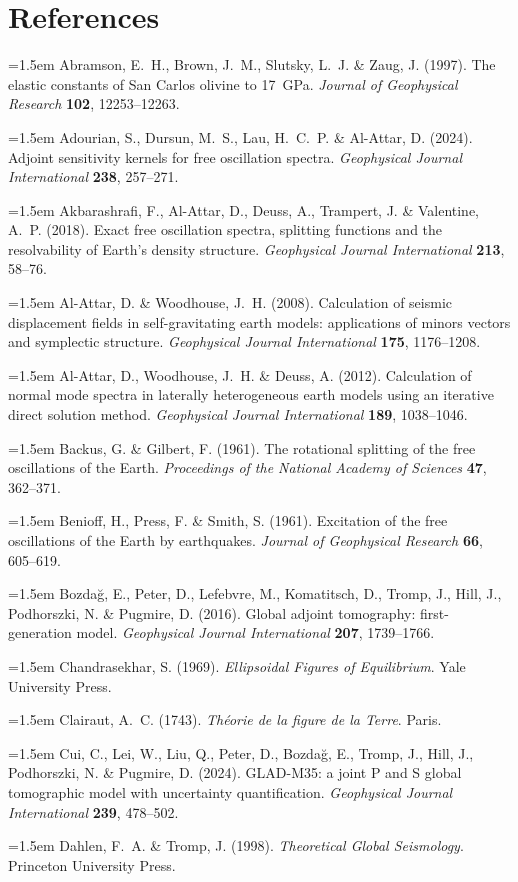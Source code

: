 \documentclass[a4paper,12pt]{paper}
\begin{document}
\section*{References}
\begingroup
\setlength{\parindent}{0pt}\setlength{\parskip}{2pt plus 1pt}
\newcommand{\refitem}[1]{\par\hangindent=1.5em #1}
\refitem{Abramson, E.~H., Brown, J.~M., Slutsky, L.~J. \& Zaug, J. (1997). The elastic constants of San Carlos olivine to 17~GPa. \emph{Journal of Geophysical Research} \textbf{102}, 12253--12263.}
\refitem{Adourian, S., Dursun, M.~S., Lau, H.~C.~P. \& Al-Attar, D. (2024). Adjoint sensitivity kernels for free oscillation spectra. \emph{Geophysical Journal International} \textbf{238}, 257--271.}
\refitem{Akbarashrafi, F., Al-Attar, D., Deuss, A., Trampert, J. \& Valentine, A.~P. (2018). Exact free oscillation spectra, splitting functions and the resolvability of Earth's density structure. \emph{Geophysical Journal International} \textbf{213}, 58--76.}
\refitem{Al-Attar, D. \& Woodhouse, J.~H. (2008). Calculation of seismic displacement fields in self-gravitating earth models: applications of minors vectors and symplectic structure. \emph{Geophysical Journal International} \textbf{175}, 1176--1208.}
\refitem{Al-Attar, D., Woodhouse, J.~H. \& Deuss, A. (2012). Calculation of normal mode spectra in laterally heterogeneous earth models using an iterative direct solution method. \emph{Geophysical Journal International} \textbf{189}, 1038--1046.}
\refitem{Backus, G. \& Gilbert, F. (1961). The rotational splitting of the free oscillations of the Earth. \emph{Proceedings of the National Academy of Sciences} \textbf{47}, 362--371.}
\refitem{Benioff, H., Press, F. \& Smith, S. (1961). Excitation of the free oscillations of the Earth by earthquakes. \emph{Journal of Geophysical Research} \textbf{66}, 605--619.}
\refitem{Bozda\u{g}, E., Peter, D., Lefebvre, M., Komatitsch, D., Tromp, J., Hill, J., Podhorszki, N. \& Pugmire, D. (2016). Global adjoint tomography: first-generation model. \emph{Geophysical Journal International} \textbf{207}, 1739--1766.}
\refitem{Chandrasekhar, S. (1969). \emph{Ellipsoidal Figures of Equilibrium}. Yale University Press.}
\refitem{Clairaut, A.~C. (1743). \emph{Th\'{e}orie de la figure de la Terre}. Paris.}
\refitem{Cui, C., Lei, W., Liu, Q., Peter, D., Bozda\u{g}, E., Tromp, J., Hill, J., Podhorszki, N. \& Pugmire, D. (2024). GLAD-M35: a joint P and S global tomographic model with uncertainty quantification. \emph{Geophysical Journal International} \textbf{239}, 478--502.}
\refitem{Dahlen, F.~A. \& Tromp, J. (1998). \emph{Theoretical Global Seismology}. Princeton University Press.}
\end{document}
